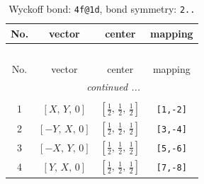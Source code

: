 \documentclass[fleqn,8pt]{jsarticle}
\begin{document}
\renewcommand{\arraystretch}{1.2}
\begin{longtable}{cccc}
\caption{Wyckoff bond: {\tt 4f@1d}, bond symmetry: {\tt 2..}}
 \\
 \hline \hline
No. & vector & center & mapping \\ \hline \endfirsthead

\multicolumn{3}{l}{\tablename\ \thetable{}} \\
 \hline \hline
No. & vector & center & mapping \\ \hline \endhead

 \hline \hline
\multicolumn{3}{r}{\footnotesize\it continued ...} \\ \endfoot

 \hline \hline
\multicolumn{3}{r}{} \\ \endlastfoot

1 & $\left[ X,\, Y,\, 0 \right]$ & $\left[ \frac{1}{2},\, \frac{1}{2},\, \frac{1}{2} \right]$ & {\tt [1,-2]} \\ \hline
2 & $\left[ - Y,\, X,\, 0 \right]$ & $\left[ \frac{1}{2},\, \frac{1}{2},\, \frac{1}{2} \right]$ & {\tt [3,-4]} \\ \hline
3 & $\left[ - X,\, Y,\, 0 \right]$ & $\left[ \frac{1}{2},\, \frac{1}{2},\, \frac{1}{2} \right]$ & {\tt [5,-6]} \\ \hline
4 & $\left[ Y,\, X,\, 0 \right]$ & $\left[ \frac{1}{2},\, \frac{1}{2},\, \frac{1}{2} \right]$ & {\tt [7,-8]} \\
\end{longtable}
\renewcommand{\arraystretch}{1.2}
\end{document}
